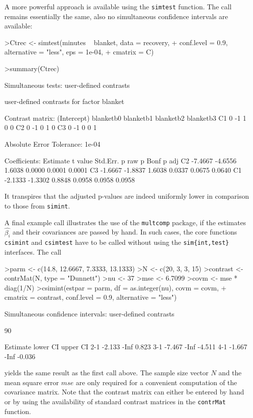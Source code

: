 \documentclass{article}
\begin{document}
A more powerful approach is available using the \texttt{simtest}
function. The call remains essentially the same, also no simultaneous confidence intervals are available:
\small
\begin{Schunk}
\begin{Sinput}
>Ctrec <- simtest(minutes ~ blanket, data = recovery, 
+     conf.level = 0.9, alternative = "less", eps = 1e-04, 
+     cmatrix = C)
\end{Sinput}
\end{Schunk}
\begin{Schunk}
\begin{Sinput}
>summary(Ctrec)
\end{Sinput}
\begin{Soutput}
	 Simultaneous tests: user-defined contrasts 

	 user-defined contrasts for factor blanket

Contrast matrix:
   (Intercept) blanketb0 blanketb1 blanketb2 blanketb3
C1           0        -1         1         0         0
C2           0        -1         0         1         0
C3           0        -1         0         0         1


Absolute Error Tolerance:  1e-04 

Coefficients:
   Estimate t value Std.Err.  p raw p Bonf  p adj
C2  -7.4667 -4.6556   1.6038 0.0000 0.0001 0.0001
C3  -1.6667 -1.8837   1.6038 0.0337 0.0675 0.0640
C1  -2.1333 -1.3302   0.8848 0.0958 0.0958 0.0958
\end{Soutput}
\end{Schunk}
\normalsize
It transpires that the adjusted p-values are indeed
uniformly lower in comparison to those from \texttt{simint}.

A final example call illustrates the use of the \texttt{multcomp} package, if the
estimates $\hat{\beta_i}$ and their covariances are passed by
hand. In such cases, the core functions \texttt{csimint} and
\texttt{csimtest} have to be called without using the
\texttt{sim\{int,test\}} interfaces. The call 
\small
\begin{Schunk}
\begin{Sinput}
>parm <- c(14.8, 12.6667, 7.3333, 13.1333)
>N <- c(20, 3, 3, 15)
>contrast <- contrMat(N, type = "Dunnett")
>nu <- 37
>mse <- 6.7099
>covm <- mse * diag(1/N)
>csimint(estpar = parm, df = as.integer(nu), covm = covm, 
+     cmatrix = contrast, conf.level = 0.9, alternative = "less")
\end{Sinput}
\begin{Soutput}
	Simultaneous confidence intervals: user-defined
	contrasts

	90 % confidence intervals

    Estimate lower CI upper CI
2-1   -2.133     -Inf    0.823
3-1   -7.467     -Inf   -4.511
4-1   -1.667     -Inf   -0.036
\end{Soutput}
\end{Schunk}
\normalsize 
yields the same result as the first call above. The
sample size vector $N$ and the mean square error $mse$ are only
required for a convenient computation of the covariance matrix.
Note that the contrast matrix can either be entered by hand or by
using the availability of standard contrast matrices in the
\texttt{contrMat} function.
\end{document}
